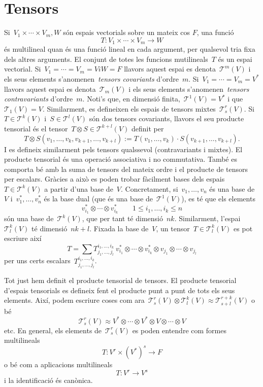 \section{Tensors}

Si~$V_1\times\cdots\times V_m,W$ són espais vectorials sobre un
mateix cos $F$, una funció
\[
	T:V_1\times\cdots\times V_m\to W
\]
és multilineal quan és una funció lineal en cada argument, per
qualsevol tria fixa dels altres arguments.  El conjunt de totes les
funcions mutilineals~$T$ és un espai vectorial.  Si~$V_1=\cdots=V_m=V i W
= F$ llavors aquest espai es denota~$\mathcal{T}^m(V)$ i els seus
elements s'anomenen~\emph{tensors covariants} d'ordre~$m$.
Si~$V_1=\cdots=V_m=V^*$ llavors aquest espai es
denota~$\mathcal{T}_m(V)$ i els seus elements
s'anomenen~\emph{tensors contravariants} d'ordre~$m$.  Noti's que, en
dimensió finita,~$\mathcal{T}^1(V)=V^*$ i que~$\mathcal{T}_1(V)=V$.
Similarment, es defineixen els espais de tensors
mixtes~$\mathcal{T}^r_s(V)$.  Si~$T\in\mathcal{T}^k(V)$
i~$S\in\mathcal{T}^l(V)$ són dos tensors covariants, llavors el seu
producte tensorial és el tensor~$T\otimes S\in\mathcal{T}^{k+l}(V)$
definit per
\[
	T\otimes S(v_1,\dots,v_k,v_{k+1},\dots,v_{k+l}) := T(v_1,\dots,v_k)\cdot S(v_{k+1},\dots,v_{k+l}).
\]
I es defineix similarment pels tensors qualssevol (contravariants i
mixtes).  El producte tensorial és una operació associativa i no
commutativa.  També es comporta bé amb la suma de tensors del mateix
ordre i el producte de tensors per escalars.  Gràcies a això es poden
trobar fàcilment bases dels espais~$T\in\mathcal{T}^k(V)$ a partir
d'una base de~$V$. Concretament, si~$v_1,\dots,v_n$ és una base de~$V$
i~$v_1^*,\dots,v_n^*$ és la base dual (que és una base
de~$\mathcal{T}^1(V)$), es té que els elements
\[
    v^*_{i_1}\otimes\cdots\otimes v^*_{i_k}\qquad 1\le i_1,\dots,i_k\le n 
\]
són una base de~$\mathcal{T}^k(V)$, que per tant té dimensió~$nk$.
Similarment, l'espai~$\mathcal{T}^k_l(V)$ té dimensió~$nk + l$.
Fixada la base de~$V$, un tensor~$T\in\mathcal{T}^k_l(V)$ es pot
escriure així
\[
    T= \sum T^{i_1,\dots,i_k}_{j_1,\dots,j_l}\  v^*_{i_1}\otimes\cdots\otimes v^*_{i_k}\otimes v_{j_1}\otimes\cdots\otimes v_{j_l}
\]
per uns certs escalars~$T^{i_1,\dots,i_k}_{j_1,\dots,j_l}$.

Tot just hem definit el producte tensorial de tensors.  El producte
tensorial d'espais tensorials es defineix fent el producte punt a
punt de tots els seus elements.  Així, podem escriure coses com
ara~$\mathcal{T}^r_s(V)\otimes\mathcal{T}^k_l(V)
\approx\mathcal{T}^{r+k}_{s+l}(V)$ o bé
\[
	\mathcal{T}^r_s(V) \approx V^*\otimes\cdots\otimes V^*\otimes
	V\otimes\cdots\otimes V
\]
etc. En general, els elements de~$\mathcal{T}^r_s(V)$ es poden entendre com
formes multilineals
\[
    T:V^r\times(V^*)^s\to F
\]
o bé com a aplicacions multilineals
\[
    T:V^r\to V^s
\]
i la identificació és canònica.


